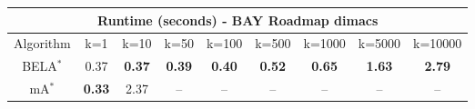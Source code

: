 \begin{tabular}{c|cccccccc}\toprule
\multicolumn{9}{c}{Runtime (seconds) - BAY Roadmap dimacs}\\ \midrule
Algorithm & k=1 & k=10 & k=50 & k=100 & k=500 & k=1000 & k=5000 & k=10000 \\ \midrule
BELA$^*$ & 0.37 & \textbf{0.37} & \textbf{0.39} & \textbf{0.40} & \textbf{0.52} & \textbf{0.65} & \textbf{1.63} & \textbf{2.79} \\
mA$^*$ & \textbf{0.33} & 2.37 & -- & -- & -- & -- & -- & -- \\ \bottomrule 
\end{tabular}
